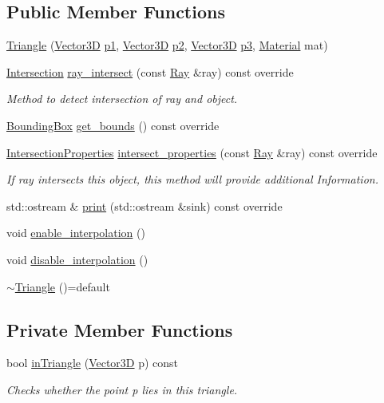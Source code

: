 \subsection*{Public Member Functions}
\begin{DoxyCompactItemize}
\item 
\hyperlink{classTriangle_a4a1cc7d9d62014eb2453d18bbd05608f}{Triangle} (\hyperlink{classVector3D}{Vector3D} \hyperlink{classTriangle_a0461ba6ca1a0e1aa84062f93eacbe8b8}{p1}, \hyperlink{classVector3D}{Vector3D} \hyperlink{classTriangle_aa15acbc4f123f3e9e75e574566c2679a}{p2}, \hyperlink{classVector3D}{Vector3D} \hyperlink{classTriangle_a600c7366c1dad8996026742eb12434c6}{p3}, \hyperlink{classMaterial}{Material} mat)
\item 
\hyperlink{classIntersection}{Intersection} \hyperlink{classTriangle_a1ee77d1d4ddeae939e08711b30dbf4f0}{ray\+\_\+intersect} (const \hyperlink{classRay}{Ray} \&ray) const override
\begin{DoxyCompactList}\small\item\em Method to detect intersection of ray and object. \end{DoxyCompactList}\item 
\hyperlink{classBoundingBox}{Bounding\+Box} \hyperlink{classTriangle_ac93216ac2308504ab7dd7679e6b84937}{get\+\_\+bounds} () const override
\item 
\hyperlink{classIntersectionProperties}{Intersection\+Properties} \hyperlink{classTriangle_abbca4150897005e47c87758833479c87}{intersect\+\_\+properties} (const \hyperlink{classRay}{Ray} \&ray) const override
\begin{DoxyCompactList}\small\item\em If ray intersects this object, this method will provide additional Information. \end{DoxyCompactList}\item 
std\+::ostream \& \hyperlink{classTriangle_af5089786289dbeb3a5f41affb4edb569}{print} (std\+::ostream \&sink) const override
\item 
void \hyperlink{classTriangle_a1a81c94f82103c8f1b81e006d8b03356}{enable\+\_\+interpolation} ()
\item 
void \hyperlink{classTriangle_a4465d15c66b5a61bfe3441b4e0676686}{disable\+\_\+interpolation} ()
\item 
\hyperlink{classTriangle_a2b4c058428898080754e39009819ca38}{$\sim$\+Triangle} ()=default
\end{DoxyCompactItemize}
\subsection*{Private Member Functions}
\begin{DoxyCompactItemize}
\item 
bool \hyperlink{classTriangle_a1b3d921c1ed274eb5c30504826cf75a9}{in\+Triangle} (\hyperlink{classVector3D}{Vector3D} p) const 
\begin{DoxyCompactList}\small\item\em Checks whether the point p lies in this triangle. \end{DoxyCompactList}\end{DoxyCompactItemize}

